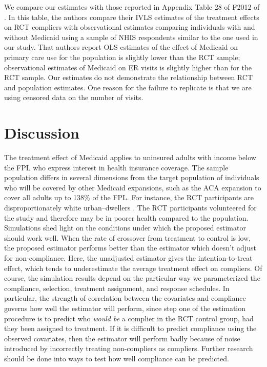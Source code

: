 \documentclass[12pt]{article}
\begin{document}
We compare our estimates with those reported in Appendix Table 28 of F2012 of \citet{finkelstein2012}. In this table, the authors compare their IVLS estimates of the treatment effects on RCT compliers with observational estimates comparing individuals with and without Medicaid using a sample of NHIS respondents similar to the one used in our study. That authors report OLS estimates of the effect of Medicaid on primary care use for the population is slightly lower than the RCT sample; observational estimates of Medicaid on ER visits is slightly higher than for the RCT sample. Our estimates do not demonstrate the relationship between RCT and population estimates. One reason for the failure to replicate is that we are using censored data on the number of visits. 


\section{Discussion}

The treatment effect of Medicaid applies to uninsured adults with income below the FPL who express interest in health insurance coverage. The sample population differs in several dimensions from the target population of individuals who will be covered by other Medicaid expansions, such as the ACA expansion to cover all adults up to 138\% of the FPL. For instance, the RCT participants are disproportionately white urban--dwellers \cite{Taubman}. The RCT participants volunteered for the study and therefore may be in poorer health compared to the population. \\

Simulations shed light on the conditions under which the proposed estimator should work well.  When the rate of crossover from treatment to control is low, the proposed estimator performs better than the estimator which doesn't adjust for non-compliance.  Here, the unadjusted estimator gives the intention-to-treat effect, which tends to underestimate the average treatment effect on compliers. Of course, the simulation results depend on the particular way we parameterized the compliance, selection, treatment assignment, and response schedules.  In particular, the strength of correlation between the covariates and compliance governs how well the estimator will perform, since step one of the estimation procedure is to predict who \textit{would be} a complier in the RCT control group, had they been assigned to treatment. If it is difficult to predict compliance using the observed covariates, then the estimator will perform badly because of noise introduced by incorrectly treating non-compliers as compliers.  Further research should be done into ways to test how well compliance can be predicted. \\
\end{document}
